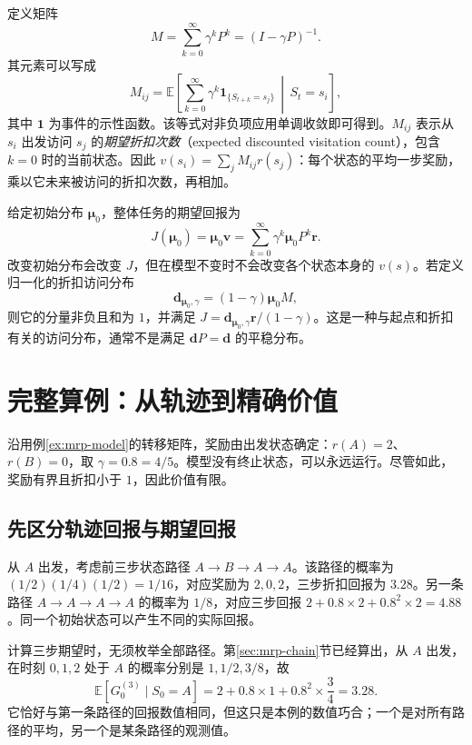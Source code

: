 \documentclass[UTF8,12pt,a4paper,fontset=fandol]{ctexart}
\begin{document}
定义矩阵
\begin{equation}
  M=\sum_{k=0}^{\infty}\gamma^kP^k=(I-\gamma P)^{-1}.
  \label{eq:mrp-occupancy-matrix}
\end{equation}
其元素可以写成
\begin{equation}
  M_{ij}=\mathbb E\!\left[\sum_{k=0}^{\infty}
       \gamma^k\mathbf 1_{\{S_{t+k}=s_j\}}\,\middle|\,S_t=s_i\right],
  \label{eq:mrp-occupancy-entry}
\end{equation}
其中 $\mathbf 1$ 为事件的示性函数。该等式对非负项应用单调收敛即可得到。$M_{ij}$ 表示从 $s_i$ 出发访问 $s_j$ 的\emph{期望折扣次数}（expected discounted visitation count），包含 $k=0$ 时的当前状态。因此 $v(s_i)=\sum_jM_{ij}r(s_j)$：每个状态的平均一步奖励，乘以它未来被访问的折扣次数，再相加。

给定初始分布 $\boldsymbol\mu_0$，整体任务的期望回报为
\begin{equation}
  J(\boldsymbol\mu_0)=\boldsymbol\mu_0\boldsymbol v
  =\sum_{k=0}^{\infty}\gamma^k\boldsymbol\mu_0P^k\boldsymbol r.
  \label{eq:mrp-start-value}
\end{equation}
改变初始分布会改变 $J$，但在模型不变时不会改变各个状态本身的 $v(s)$。若定义归一化的折扣访问分布
\[
  \boldsymbol d_{\boldsymbol\mu_0,\gamma}
  =(1-\gamma)\boldsymbol\mu_0M,
\]
则它的分量非负且和为 $1$，并满足 $J=\boldsymbol d_{\boldsymbol\mu_0,\gamma}\boldsymbol r/(1-\gamma)$。这是一种与起点和折扣有关的访问分布，通常不是满足 $\boldsymbol dP=\boldsymbol d$ 的平稳分布。

\section{完整算例：从轨迹到精确价值}
\label{sec:mrp-worked-example}

沿用例\ref{ex:mrp-model}的转移矩阵，奖励由出发状态确定：$r(A)=2$、$r(B)=0$，取 $\gamma=0.8=4/5$。模型没有终止状态，可以永远运行。尽管如此，奖励有界且折扣小于 $1$，因此价值有限。

\subsection{先区分轨迹回报与期望回报}

从 $A$ 出发，考虑前三步状态路径 $A\to B\to A\to A$。该路径的概率为 $(1/2)(1/4)(1/2)=1/16$，对应奖励为 $2,0,2$，三步折扣回报为 $3.28$。另一条路径 $A\to A\to A\to A$ 的概率为 $1/8$，对应三步回报 $2+0.8\times2+0.8^2\times2=4.88$。同一个初始状态可以产生不同的实际回报。

计算三步期望时，无须枚举全部路径。第\ref{sec:mrp-chain}节已经算出，从 $A$ 出发，在时刻 $0,1,2$ 处于 $A$ 的概率分别是 $1,1/2,3/8$，故
\[
  \mathbb E[G_0^{(3)}\mid S_0=A]
  =2+0.8\times1+0.8^2\times\frac34=3.28.
\]
它恰好与第一条路径的回报数值相同，但这只是本例的数值巧合；一个是对所有路径的平均，另一个是某条路径的观测值。
\end{document}
